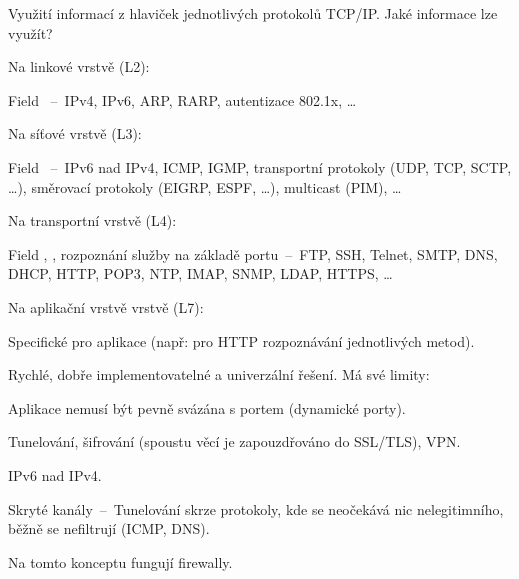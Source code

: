 \begin{compactitem}
    \item Využití informací z hlaviček jednotlivých protokolů TCP/IP. Jaké informace lze využít? \begin{compactitem}
        \item Na linkové vrstvě (L2): \begin{compactitem}
            \item Field ~--~IPv4, IPv6, ARP, RARP, autentizace 802.1x, \dots
        \end{compactitem}
        \item Na síťové vrstvě (L3): \begin{compactitem}
            \item Field ~--~IPv6 nad IPv4, ICMP, IGMP, transportní protokoly (UDP, TCP, SCTP, \dots), směrovací protokoly (EIGRP, ESPF, \dots), multicast (PIM), \dots
        \end{compactitem}
        \item  Na transportní vrstvě (L4): \begin{compactitem}
            \item Field , , rozpoznání služby na základě portu~--~FTP, SSH, Telnet, SMTP, DNS, DHCP, HTTP, POP3, NTP, IMAP, SNMP, LDAP, HTTPS, \dots
        \end{compactitem}
        \item  Na aplikační vrstvě vrstvě (L7): \begin{compactitem}
            \item Specifické pro aplikace (např: pro HTTP rozpoznávání jednotlivých metod).
        \end{compactitem}
    \end{compactitem}
    \item Rychlé, dobře implementovatelné a univerzální řešení. Má své limity: \begin{compactitem}
        \item Aplikace nemusí být pevně svázána s portem (dynamické porty).
        \item Tunelování, šifrování (spoustu věcí je zapouzdřováno do SSL/TLS), VPN.
        \item IPv6 nad IPv4.
        \item Skryté kanály~--~Tunelování skrze protokoly, kde se neočekává nic nelegitimního, běžně se nefiltrují (ICMP, DNS).
    \end{compactitem}
    \item Na tomto konceptu fungují firewally.
\end{compactitem}

